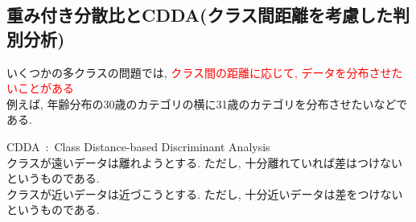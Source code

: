 \documentclass[dvipdfmx,a4j]{jsarticle}
\begin{document}
\subsection{重み付き分散比とCDDA(クラス間距離を考慮した判別分析)}
いくつかの多クラスの問題では, \textcolor{red}{クラス間の距離に応じて, データを分布させたいことがある}\\
例えば, 年齢分布の30歳のカテゴリの横に31歳のカテゴリを分布させたいなどである.
\begin{center}
\end{center}
CDDA\ :\ Class Distance-based Discriminant Analysis\\
クラスが遠いデータは離れようとする. ただし, 十分離れていれば差はつけないというものである.\\
クラスが近いデータは近づこうとする. ただし, 十分近いデータは差をつけないというものである.
\end{document}
